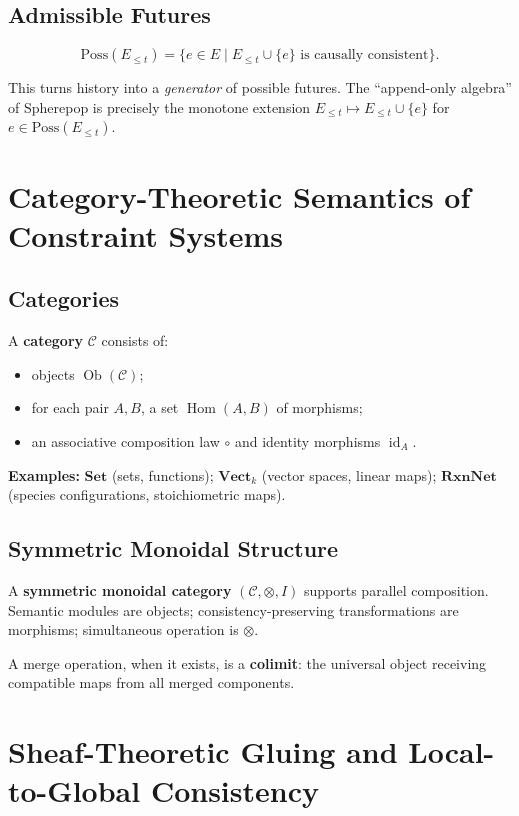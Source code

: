 \documentclass[11pt, openany]{book}
\theoremstyle{plain}
\theoremstyle{definition}
\theoremstyle{remark}
\DeclareMathOperator{\Hom}{Hom}
\DeclareMathOperator{\Ob}{Ob}
\DeclareMathOperator{\id}{id}
\begin{document}
\section{Admissible Futures}

\[
  \mathrm{Poss}(E_{\le t})
  =\{e\in E\mid E_{\le t}\cup\{e\}\text{ is causally consistent}\}.
\]

This turns history into a \emph{generator} of possible futures. The
``append-only algebra'' of Spherepop is precisely the monotone extension
$E_{\le t}\mapsto E_{\le t}\cup\{e\}$ for $e\in\mathrm{Poss}(E_{\le t})$.

\chapter{Category-Theoretic Semantics of Constraint Systems}

\section{Categories}

A \textbf{category} $\mathcal{C}$ consists of:
\begin{itemize}
\item objects $\Ob(\mathcal{C})$;
\item for each pair $A,B$, a set $\Hom(A,B)$ of morphisms;
\item an associative composition law $\circ$ and identity morphisms $\id_A$.
\end{itemize}

\textbf{Examples:} $\mathbf{Set}$ (sets, functions); $\mathbf{Vect}_k$
(vector spaces, linear maps); $\mathbf{RxnNet}$ (species configurations,
stoichiometric maps).

\section{Symmetric Monoidal Structure}

A \textbf{symmetric monoidal category} $(\mathcal{C},\otimes,I)$ supports
parallel composition. Semantic modules are objects; consistency-preserving
transformations are morphisms; simultaneous operation is $\otimes$.

A merge operation, when it exists, is a \textbf{colimit}: the universal
object receiving compatible maps from all merged components.

\chapter{Sheaf-Theoretic Gluing and Local-to-Global Consistency}
\end{document}

